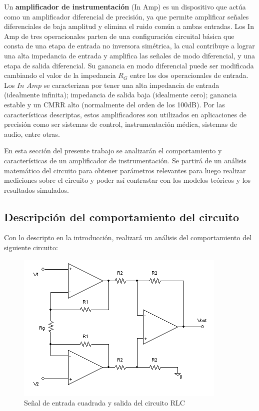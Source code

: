 Un \textbf{amplificador de instrumentación} (In Amp) es un dispositivo que actúa como un amplificador diferencial de precisión, ya que permite amplificar señales diferenciales de baja amplitud y elimina el ruido común a ambas entradas. Los In Amp de tres operacionales parten de una configuración circuital básica que consta de una etapa de entrada no inversora simétrica, la cual contribuye a lograr una alta impedancia de entrada y amplifica las señales de modo diferencial, y una etapa de salida diferencial. Su ganancia en modo diferencial puede ser modificada cambiando el valor de la impedancia $R_G$ entre los dos operacionales de entrada. Los $In$ $Amp$ se caracterizan por tener una alta impedancia de entrada (idealmente infinita); impedancia de salida baja (idealmente cero); ganancia estable y un CMRR alto (normalmente del orden de los 100dB). Por las características descriptas, estos amplificadores son utilizados en aplicaciones de precisión como ser sistemas de control, instrumentación médica, sistemas de audio, entre otras. 

En esta sección del presente trabajo se analizarán el comportamiento y características de un amplificador de instrumentación. Se partirá de un análisis matemático del circuito para obtener parámetros relevantes para luego realizar mediciones sobre el circuito y poder así contrastar con los modelos teóricos y los resultados simulados. 

\subsection{Descripción del comportamiento del circuito}

Con lo descripto en la introducción, realizará un análisis del comportamiento del siguiente circuito:

\begin{figure}[H]
    \centering
    \includegraphics[scale=0.25]{../Ejercicio3-AmplificadorDeInstrumentacion/Imagenes/InAmpWiki.png}
    \caption{Señal de entrada cuadrada y salida del circuito RLC}
    \label{fig:}
\end{figure}


